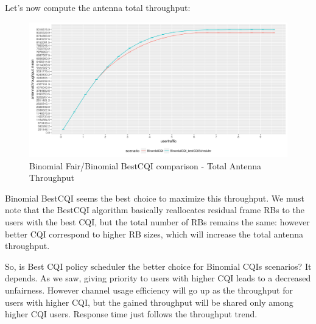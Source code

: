 Let's now compute the antenna total throughput:
\begin{figure}[H]
  \includegraphics[width=1\textwidth]{images/thantenna-2.png}
  \caption{Binomial Fair/Binomial BestCQI comparison - Total Antenna Throughput}
  \label{fig:thantenna-2}
\end{figure}

Binomial BestCQI seems the best choice to maximize this throughput. We must note that the BestCQI algorithm basically reallocates residual frame RBs to the users with the best CQI, but the total number of RBs remains the same: however better CQI correspond to higher RB sizes, which will increase the total antenna throughput.

So, is Best CQI policy scheduler the better choice for Binomial CQIs scenarios? It depends. As we saw, giving priority to users with higher CQI leads to a decreased unfairness. However channel usage efficiency will go up as the throughput for users with higher CQI, but the gained throughput will be shared only among higher CQI users. Response time just follows the throughput trend.
